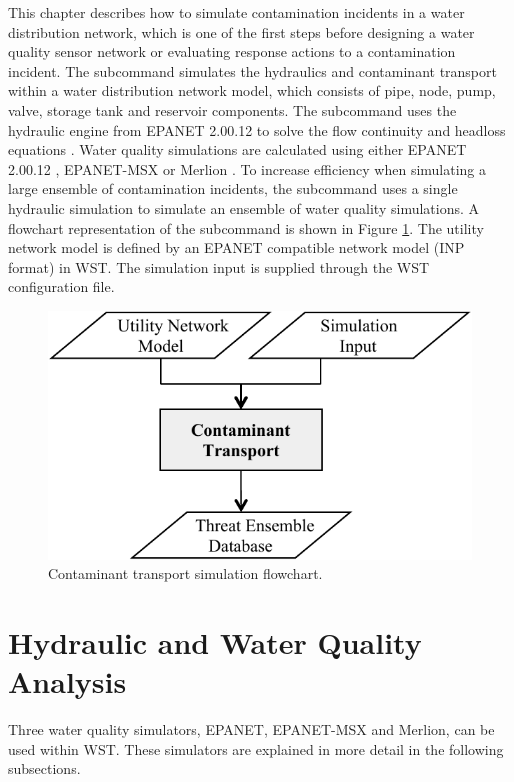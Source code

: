 This chapter describes how to simulate contamination incidents in a water distribution network, 
which is one of the first steps before designing a water quality sensor network or evaluating
response actions to a contamination incident. The  subcommand simulates 
the hydraulics and contaminant transport within a water distribution network model, which 
consists of pipe, node, pump, valve, storage tank and reservoir components. 
The  subcommand uses the hydraulic engine from EPANET 2.00.12 to solve the flow 
continuity and headloss equations \citep{EPANETusermanual}. Water quality simulations are calculated
using either EPANET 2.00.12 \citep{EPANETusermanual}, EPANET-MSX \citep{ShaUbeRos11}
or Merlion \citep{Merlion12}. To increase efficiency when simulating a large ensemble 
of contamination incidents, the  subcommand uses a single hydraulic simulation 
to simulate an ensemble of water quality simulations. 
A flowchart representation of the  subcommand is shown in Figure \ref{fig:tevasim-flowchart}. 
The utility network model is defined by an EPANET compatible network model (INP format) in WST. 
The simulation input is supplied through the  WST configuration file.

\begin{figure}[h]
  \centering
  \includegraphics[scale=0.80]{graphics/tevasim_flowchart.pdf}
  \caption{Contaminant transport simulation flowchart.}
  \label{fig:tevasim-flowchart}
\end{figure}

\section{Hydraulic and Water Quality Analysis}
Three water quality simulators, EPANET, EPANET-MSX and Merlion, can be used within WST. These 
simulators are explained in more detail in the following subsections.
